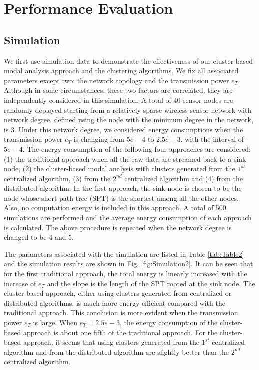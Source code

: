 \section{Performance Evaluation}
\label{sec:PerformanceEvaluation}
\subsection{Simulation}
We first use simulation data to demonstrate the effectiveness of our cluster-based modal analysis approach and the clustering algorithms. We fix all associated parameters except two: the network topology and the transmission power \(e_T\). Although in some circumstances, these two factors are correlated, they are independently considered in this simulation. A total of 40 sensor nodes are randomly deployed starting from a relatively sparse wireless sensor network with network degree, defined using the node with the minimum degree in the network, is 3. Under this network degree, we considered energy consumptions when the transmission power \(e_T\) is changing from \(5e-4\) to \(2.5e-3\), with the interval of \(5e-4\).  The energy consumption of the following four approaches are considered:(1) the traditional approach when all the raw data are streamed back to a sink node, (2) the cluster-based modal analysis with clusters generated from the \(1^{st}\) centralized algorithm, (3) from the \(2^{nd}\) centralized algorithm and (4) from the distributed algorithm. In the first approach, the sink node is chosen to be the node whose short path tree (SPT) is the shortest among all the other nodes. Also, no computation energy is included in this approach. A total of 500 simulations are performed and the average energy consumption of each approach is calculated. The above procedure is repeated when the network degree is changed to be 4 and 5.

The parameters associated with the simulation are listed in Table \ref{tab:Table2} and the simulation results are shown in Fig. \ref{fig:Simulation2}. It can be seen that for the first traditional approach, the total energy is linearly increased with the increase of \(e_T\) and the slope is the length of the SPT rooted at the sink node.  The cluster-based approach, either using clusters generated from centralized or distributed algorithms, is much more energy efficient compared with the traditional approach. This conclusion is more evident when the transmission power \(e_T\) is large. When \(e_T = 2.5e-3\), the energy consumption of the cluster-based approach is about one fifth of the traditional approach.  For the cluster-based approach, it seems that using clusters generated from the \(1^{st}\) centralized algorithm and from the distributed algorithm are slightly better than the \(2^{nd}\) centralized algorithm. 

